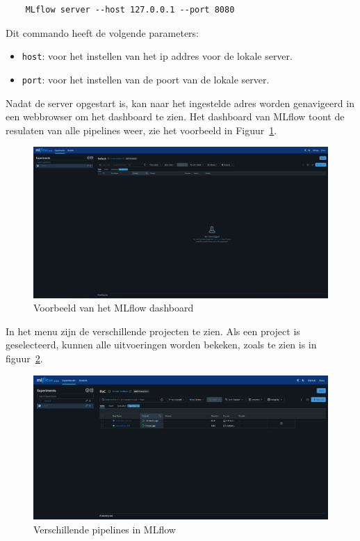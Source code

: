 \begin{verbatim}
    MLflow server --host 127.0.0.1 --port 8080
\end{verbatim}

Dit commando heeft de volgende parameters:

\begin{itemize}
    \item \texttt{host}: voor het instellen van het ip addres voor de lokale server.
    \item \texttt{port}: voor het instellen van de poort van de lokale server.
\end{itemize}

Nadat de server opgestart is, kan naar het ingestelde adres worden genavigeerd in een webbrowser om het dashboard te zien. Het dashboard van MLflow toont de resulaten van alle pipelines weer, zie het voorbeeld in Figuur~\ref{fig:MLflow_dashboard}.

\begin{figure}
    \centering
    \includegraphics[width=0.9\linewidth]{graphics/MLflow_dashboard.PNG}
    \caption{Voorbeeld van het MLflow dashboard}
    \label{fig:MLflow_dashboard}
\end{figure}

In het menu zijn de verschillende projecten te zien. Als een project is geselecteerd, kunnen alle uitvoeringen worden bekeken, zoals te zien is in figuur~\ref{fig:MLflow_runs}.
\begin{figure}
    \centering
    \includegraphics[width=0.9\linewidth]{graphics/MLflow_Runs.PNG}
    \caption{Verschillende pipelines in MLflow}
    \label{fig:MLflow_runs}
\end{figure}

